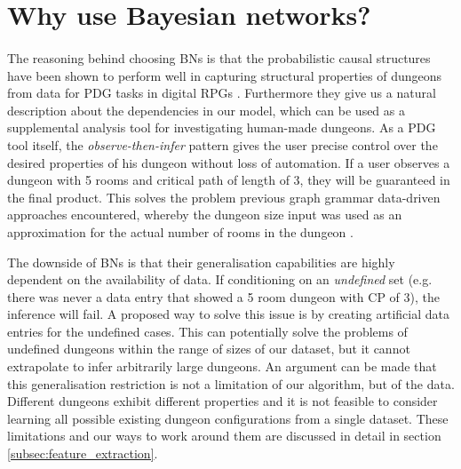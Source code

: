 \documentclass{UoYCSproject}
\begin{document}
\section{Why use Bayesian networks?}
\paragraph{}
The reasoning behind choosing BNs is that the probabilistic causal structures have been shown to perform well in capturing structural properties of dungeons from data for PDG tasks in digital RPGs \parencite{SummervilleLearningOfZelda,SummervilleSamplingHyrule}. Furthermore they give us a natural description about the dependencies in our model, which can be used as a supplemental analysis tool for investigating human-made dungeons. As a PDG tool itself, the \textit{observe-then-infer} pattern gives the user precise control over the desired properties of his dungeon without loss of automation. If a user observes a dungeon with 5 rooms and critical path of length of 3, they will be guaranteed in the final product. This solves the problem previous graph grammar data-driven approaches encountered, whereby the dungeon size input was used as an approximation for the actual number of rooms in the dungeon \parencite{Deery}.

The downside of BNs is that their generalisation capabilities are highly dependent on the availability of data. If conditioning on an \textit{undefined} set (e.g. there was never a data entry that showed a 5 room dungeon with CP of 3), the inference will fail. A proposed way to solve this issue is by creating artificial data entries for the undefined cases. This can potentially solve the problems of undefined dungeons within the range of sizes of our dataset, but it cannot extrapolate to infer arbitrarily large dungeons. An argument can be made that this generalisation restriction is not a limitation of our algorithm, but of the data. Different dungeons exhibit different properties and it is not feasible to consider learning all possible existing dungeon configurations from a single dataset. These limitations and our ways to work around them are discussed in detail in section \ref{subsec:feature_extraction}.
\end{document}
